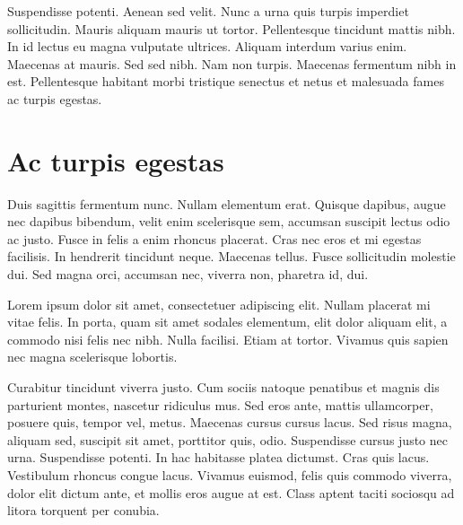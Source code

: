 \documentclass[../hdr.tex]{subfiles}
\begin{document}
Suspendisse potenti. Aenean sed velit. Nunc a urna quis turpis imperdiet
sollicitudin. Mauris aliquam mauris ut tortor. Pellentesque tincidunt mattis
nibh. In id lectus eu magna vulputate ultrices. Aliquam interdum varius enim.
Maecenas at mauris. Sed sed nibh. Nam non turpis. Maecenas fermentum nibh in
est. Pellentesque habitant morbi tristique senectus et netus et malesuada fames
ac turpis egestas.

\section{Ac turpis egestas}

Duis sagittis fermentum nunc. Nullam elementum erat. Quisque dapibus, augue nec
dapibus bibendum, velit enim scelerisque sem, accumsan suscipit lectus odio ac
justo. Fusce in felis a enim rhoncus placerat. Cras nec eros et mi egestas
facilisis. In hendrerit tincidunt neque. Maecenas tellus. Fusce sollicitudin
molestie dui. Sed magna orci, accumsan nec, viverra non, pharetra id, dui.

Lorem ipsum dolor sit amet, consectetuer adipiscing elit. Nullam placerat mi
vitae felis. In porta, quam sit amet sodales elementum, elit dolor aliquam elit,
a commodo nisi felis nec nibh. Nulla facilisi. Etiam at tortor. Vivamus quis
sapien nec magna scelerisque lobortis.

Curabitur tincidunt viverra justo. Cum sociis natoque penatibus et magnis dis
parturient montes, nascetur ridiculus mus. Sed eros ante, mattis ullamcorper,
posuere quis, tempor vel, metus. Maecenas cursus cursus lacus. Sed risus magna,
aliquam sed, suscipit sit amet, porttitor quis, odio. Suspendisse cursus justo
nec urna. Suspendisse potenti. In hac habitasse platea dictumst. Cras quis
lacus. Vestibulum rhoncus congue lacus. Vivamus euismod, felis quis commodo
viverra, dolor elit dictum ante, et mollis eros augue at est. Class aptent
taciti sociosqu ad litora torquent per conubia.



\ifSubfilesClassLoaded{%
\printbibliography
}{%
  \vskip2cm
}
\end{document}
